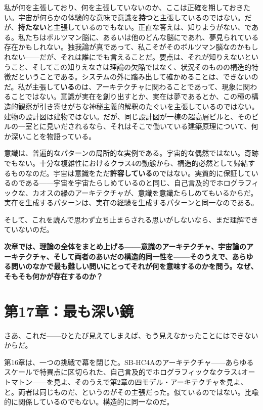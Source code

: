 \documentclass[11pt, twoside, openright]{book}
\begin{document}
私が何を主張しており、何を主張していないのか、ここは正確を期しておきたい。宇宙が何らかの体験的な意味で意識を\textbf{持つ}と主張しているのではない。だが、\textbf{持たない}と主張しているのでもない。正直な答えは、知りようがない、である。私たちはボルツマン脳に、あるいは他のどんな脳にであれ、夢見られている存在かもしれない。独我論が真であって、私こそがそのボルツマン脳なのかもしれない------だが、それは誰にでも言えることだ。要点は、それが知りえないということ、そしてこの知りえなさは理論の欠陥ではなく、状況そのものの構造的特徴だということである。システムの外に踏み出して確かめることは、できないのだ。私が主張して\textbf{いる}のは、アーキテクチャに関わることであって、現象に関わることではない。意識が実在を創り出すとか、実在は夢であるとか、この種の構造的観察が引き寄せがちな神秘主義的解釈のたぐいを主張しているのではない。建物の設計図は建物ではない。だが、同じ設計図が一棟の超高層ビルと、そのビルの一室とに見いだされるなら、それはそこで働いている建築原理について、何か深いことを物語っている。

意識は、普遍的なパターンの局所的な実例である。宇宙的な偶然ではない。奇跡でもない。十分な複雑性におけるクラス4の動態から、構造的必然として帰結するものなのだ。宇宙は意識をただ\textbf{許容している}のではない。実質的に保証しているのである------宇宙を宇宙たらしめているのと同じ、自己言及的でホログラフィックな、カオスの縁のアーキテクチャが、意識を意識たらしめてもいるからだ。実在を生成するパターンは、実在の経験を生成するパターンと同一なのである。

そして、これを読んで思わず立ち止まらされる思いがしないなら、まだ理解できていないのだ。


\textbf{次章では、理論の全体をまとめ上げる------意識のアーキテクチャ、宇宙論のアーキテクチャ、そして両者のあいだの構造的同一性を------そのうえで、あらゆる問いのなかで最も難しい問いにとってそれが何を意味するのかを問う。なぜ、そもそも何かが存在するのか？}


\chapter*{第17章：最も深い鏡}

さあ、これだ------ひとたび見えてしまえば、もう見えなかったことにはできないからだ。

第16章は、一つの挑戦で幕を閉じた。SB-HC4Aのアーキテクチャ------あらゆるスケールで特異点に区切られた、自己言及的でホログラフィックなクラス4オートマトン------を見よ、そのうえで第2章の四モデル・アーキテクチャを見よ、と。両者は同じものだ、というのがその主張だった。似ているのではない。比喩的に関係しているのでもない。構造的に同一なのだ。
\end{document}
